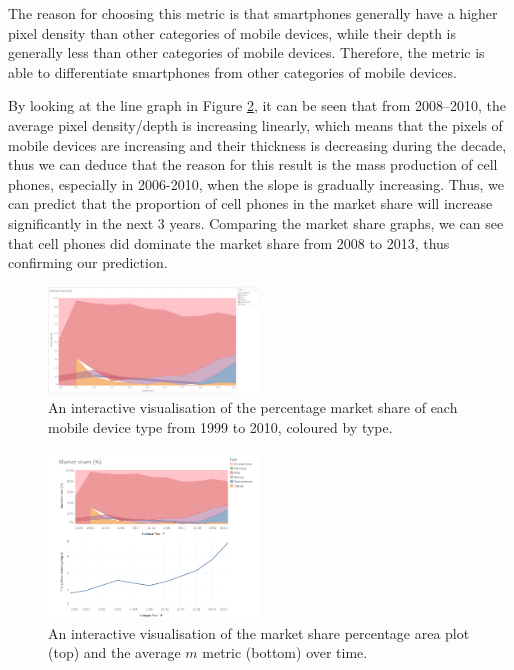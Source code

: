 \documentclass[conference]{IEEEtran}
\begin{document}
The reason for choosing this metric is that smartphones generally have a higher pixel density than other categories of mobile devices, while their depth is generally less than other categories of mobile devices. Therefore, the metric is able to differentiate smartphones from other categories of mobile devices.

By looking at the line graph in Figure \ref{fig:pixel}, it can be seen that from 2008--2010, the average pixel density/depth is increasing linearly, which means that the pixels of mobile devices are increasing and their thickness is decreasing during the decade, thus we can deduce that the reason for this result is the mass production of cell phones, especially in 2006-2010, when the slope is gradually increasing. Thus, we can predict that the proportion of cell phones in the market share will increase significantly in the next 3 years. Comparing the market share graphs, we can see that cell phones did dominate the market share from 2008 to 2013, thus confirming our prediction.

\begin{figure}
    \centering
    \includegraphics[width=0.5\textwidth]{../Visualisations/C/Market Share2.png}
    \caption{An interactive visualisation of the percentage market share of each
	mobile device type from 1999 to 2010, coloured by type.}
    \label{fig:market-2010}
\end{figure}

\begin{figure}
    \centering
    \includegraphics[width=0.5\textwidth]{../Visualisations/C/Piexel density2.png}
    \caption{An interactive visualisation of the market share percentage
	area plot (top) and the average $m$ metric (bottom) over time.}
    \label{fig:pixel}
\end{figure}
\end{document}
